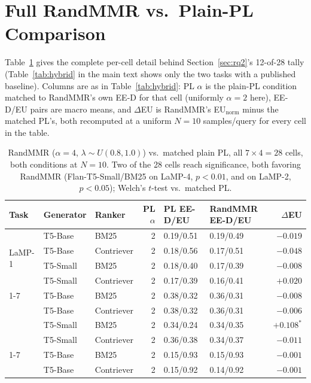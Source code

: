 \documentclass[10pt,twocolumn]{article}
\begin{document}
\section{Full RandMMR vs.\ Plain-PL Comparison}
\label{app:randmmr-full}

Table~\ref{tab:hybrid-full} gives the complete per-cell detail behind
Section~\ref{sec:rq2}'s 12-of-28 tally (Table~\ref{tab:hybrid} in the main text shows
only the two tasks with a published baseline). Columns are as in
Table~\ref{tab:hybrid}: PL $\alpha$ is the plain-PL condition matched to RandMMR's own
EE-D for that cell (uniformly $\alpha{=}2$ here), EE-D/EU pairs are macro means, and
$\Delta$EU is RandMMR's EU$_{\text{norm}}$ minus the matched PL's, both recomputed at
a uniform $N{=}10$ samples/query for every cell in the table.

\begin{table}[t]
\centering
\scriptsize
\caption{RandMMR ($\alpha{=}4$, $\lambda\sim U(0.8,1.0)$) vs.\ matched plain PL, all
$7\times4{=}28$ cells, both conditions at $N{=}10$. Two of the 28 cells reach
significance, both favoring RandMMR (Flan-T5-Small/BM25 on LaMP-4, $p{<}0.01$, and
on LaMP-2, $p{<}0.05$); Welch's $t$-test vs.\ matched PL.}
\label{tab:hybrid-full}
\begin{tabular}{@{}lllrllr@{}}
\toprule
Task & Generator & Ranker & PL $\alpha$ & PL EE-D/EU & RandMMR EE-D/EU & $\Delta$EU \\
\midrule
\multirow{4}{*}{LaMP-1} & T5-Base & BM25 & 2 & 0.19/0.51 & 0.19/0.49 & $-0.019$ \\
 & T5-Base & Contriever & 2 & 0.18/0.56 & 0.17/0.51 & $-0.048$ \\
 & T5-Small & BM25 & 2 & 0.18/0.40 & 0.17/0.39 & $-0.008$ \\
 & T5-Small & Contriever & 2 & 0.17/0.39 & 0.16/0.41 & $+0.020$ \\
\cmidrule(lr){1-7}
\multirow{4}{*}{LaMP-2} & T5-Base & BM25 & 2 & 0.38/0.32 & 0.36/0.31 & $-0.008$ \\
 & T5-Base & Contriever & 2 & 0.38/0.32 & 0.36/0.31 & $-0.006$ \\
 & T5-Small & BM25 & 2 & 0.34/0.24 & 0.34/0.35 & $+0.108^{*}$ \\
 & T5-Small & Contriever & 2 & 0.36/0.38 & 0.34/0.37 & $-0.011$ \\
\cmidrule(lr){1-7}
\multirow{4}{*}{LaMP-3} & T5-Base & BM25 & 2 & 0.15/0.93 & 0.15/0.93 & $-0.001$ \\
 & T5-Base & Contriever & 2 & 0.15/0.92 & 0.14/0.92 & $-0.001$ \\

\end{tabular}
\end{table}
\end{document}

